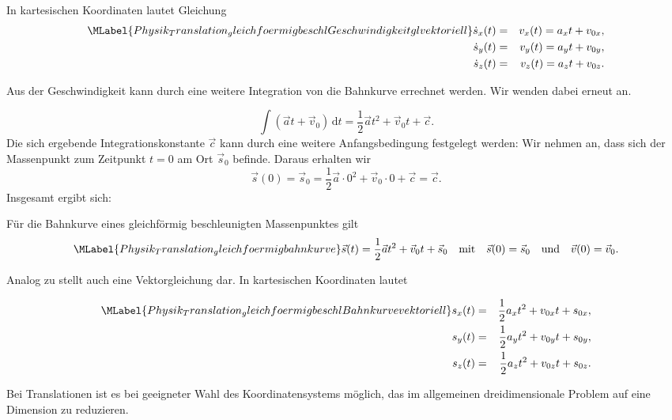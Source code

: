 \begin{MContent}
     In kartesischen Koordinaten lautet Gleichung  
     \begin{eqnarray}
          \MLabel{Physik_Translation_ gleichfoermigbeschlGeschwindigkeitglvektoriell}
          \nonumber\dot{s}_x(t) &=&v_x(t)=a_xt+v_{0x},\\
          \dot{s}_y(t)&=&v_y(t)=a_yt+v_{0y},\\
          \nonumber\dot{s}_z(t)&=&v_z(t)=a_zt+v_{0z}.
     \end{eqnarray}
     
     Aus der Geschwindigkeit kann durch eine weitere Integration von  die Bahnkurve errechnet werden. Wir wenden dabei erneut  an.
     
     
     \begin{equation*}
     \int (\vec{a}t + \vec{v}_0)\,\textrm{d}t=\frac{1}{2}\vec{a}t^2+\vec{v}_0t+\vec{c}.
     \end{equation*}
     Die sich ergebende Integrationskonstante $\vec{c}$ kann durch eine weitere Anfangsbedingung festgelegt werden: Wir nehmen an, dass sich der Massenpunkt zum Zeitpunkt $t=0$ am Ort $\vec{s}_0$ befinde. Daraus erhalten wir
     \begin{equation*}
     \vec{s}(0)=\vec{s}_0=\frac{1}{2}\vec{a}\cdot 0^2+\vec{v}_0\cdot 0+\vec{c}=\vec{c}.
     \end{equation*}
     Insgesamt ergibt sich:
     \begin{MInfo}
     F\"ur die Bahnkurve eines gleichf\"ormig beschleunigten Massenpunktes gilt
     \begin{equation}\MLabel{Physik_Translation_gleichfoermigbahnkurve}
     \vec{s}(t)=\frac{1}{2}\vec{a}t^2+\vec{v}_0t+\vec{s}_0\quad\text{mit} \quad \vec{s}(0)=\vec{s}_0\quad\text{und} \quad \vec{v}(0)=\vec{v}_0. 
     \end{equation}
     \end{MInfo}
     
     Analog zu  stellt auch  eine Vektorgleichung dar. In kartesischen Koordinaten lautet  
     
     \begin{eqnarray}
          \MLabel{Physik_Translation_ gleichfoermigbeschlBahnkurvevektoriell}
          \nonumber s_x(t)&=&\frac{1}{2}a_x t^2+v_{0x}t+s_{0x},\\
          s_y(t)&=&\frac{1}{2}a_y t^2+v_{0y}t+s_{0y},\\
         \nonumber s_z(t)&=&\frac{1}{2}a_z t^2+v_{0z}t+s_{0z}.
     \end{eqnarray}
          
     Bei Translationen ist es bei geeigneter Wahl des Koordinatensystems m\"oglich, das im allgemeinen dreidimensionale Problem auf eine Dimension zu reduzieren.
     
     \end{MContent}
     
